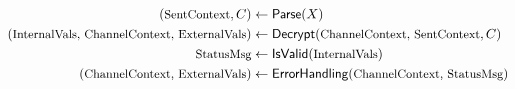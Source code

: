 \newcommand{\algfont}[1]{\textsf{#1}}
\newcommand{\varfont}[1]{\textrm{\small#1}}

\begin{align*}
(\varfont{SentContext},C) &\gets \algfont{Parse}(X) \\
(\varfont{InternalVals, ChannelContext, ExternalVals}) &\gets \algfont{Decrypt}(\varfont{ChannelContext, SentContext}, C)\\
\varfont{StatusMsg} &\gets \algfont{IsValid}(\varfont{InternalVals})\\
(\varfont{ChannelContext, ExternalVals}) &\gets \algfont{ErrorHandling}(\varfont{ChannelContext, StatusMsg})
\end{align*}

